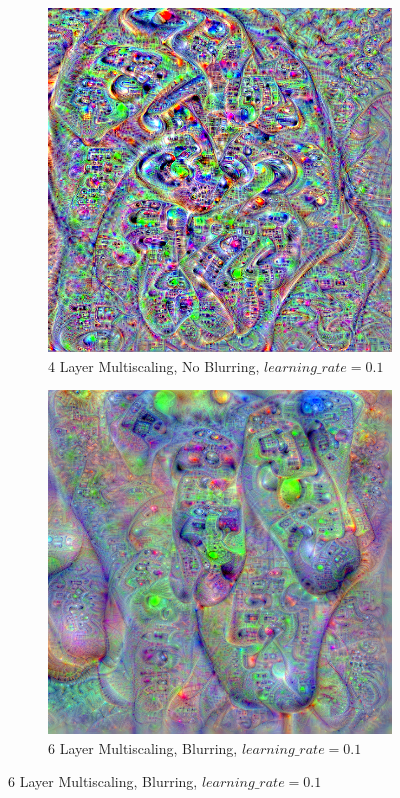 \begin{figure}
    \captionsetup{justification=centering}

    \begin{subfigure}[t]{0.31\textwidth}
        \captionsetup{justification=centering}
        \centering
        \includegraphics[width=.7\linewidth]{figuras/feat_vis/experiments/classes/cl761/random_image_ci761_lr1e-1_pl4_no-blur.png}
        \caption{4 Layer Multiscaling, No Blurring, \(learning\_rate = 0.1\)}
    \end{subfigure}
    \hfill
    \begin{subfigure}[t]{0.31\textwidth}
        \captionsetup{justification=centering}
        \centering
        \includegraphics[width=.7\linewidth]{figuras/feat_vis/experiments/classes/cl761/random_image_ci761_lr1e-1_pl6.png}
        \caption{6 Layer Multiscaling, Blurring, \(learning\_rate = 0.1\)}

\end{subfigure}
\end{figure}
